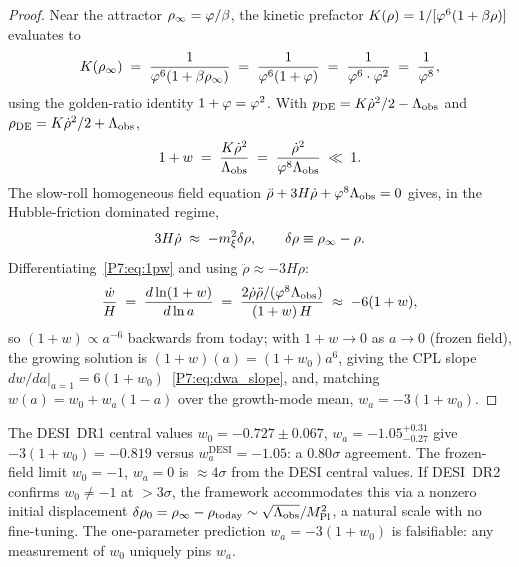 \begin{proof}
Near the attractor $\rho_{\infty}=\varphi/\beta$, the kinetic prefactor
$K(\rho)=1/[\varphi^6(1+\beta\rho)]$ evaluates to
\begin{equation}
  K(\rho_{\infty})
  \;=\; \frac{1}{\varphi^6(1+\beta\rho_{\infty})}
  \;=\; \frac{1}{\varphi^6(1+\varphi)}
  \;=\; \frac{1}{\varphi^6\cdot\varphi^2}
  \;=\; \frac{1}{\varphi^8},
  \label{P7:eq:K_attractor}
\end{equation}
using the golden-ratio identity $1+\varphi=\varphi^2$. With
$p_{\mathrm{DE}}=K\dot\rho^2/2-\Lambda_{\mathrm{obs}}$ and
$\rho_{\mathrm{DE}}=K\dot\rho^2/2+\Lambda_{\mathrm{obs}}$,
\begin{equation}
  1+w \;=\; \frac{K\dot\rho^2}{\Lambda_{\mathrm{obs}}} \;=\; \frac{\dot\rho^2}{\varphi^8\Lambda_{\mathrm{obs}}} \;\ll\; 1.
  \label{P7:eq:1pw}
\end{equation}
The slow-roll homogeneous field equation $\ddot\rho+3H\dot\rho+\varphi^8\Lambda_{\mathrm{obs}}=0$
gives, in the Hubble-friction dominated regime,
\begin{equation}
  3H\dot\rho \;\approx\; -m_\xi^2\delta\rho, \qquad \delta\rho\equiv\rho_{\infty}-\rho.
  \label{P7:eq:slow_roll}
\end{equation}
Differentiating~\eqref{P7:eq:1pw} and using $\ddot\rho\approx-3H\dot\rho$:
\begin{equation}
  \frac{\dot w}{H}
  \;=\; \frac{d\ln(1+w)}{d\ln a}
  \;=\; \frac{2\dot\rho\ddot\rho/(\varphi^8\Lambda_{\mathrm{obs}})}{(1+w)\,H}
  \;\approx\; -6(1+w),
  \label{P7:eq:dwda}
\end{equation}
so $(1+w)\propto a^{-6}$ backwards from today; with $1+w\to0$ as
$a\to0$ (frozen field), the growing solution is
$(1+w)(a)=(1+w_0)a^6$, giving the CPL slope
$dw/da|_{a=1}=6(1+w_0)$~\eqref{P7:eq:dwa_slope}, and, matching
$w(a)=w_0+w_a(1-a)$ over the growth-mode mean, $w_a=-3(1+w_0)$.
\end{proof}

\begin{remark}
\label{P7:rem:desi_consistency}
The DESI~DR1 central values $w_0=-0.727\pm0.067$, $w_a=-1.05^{+0.31}_{-0.27}$
give $-3(1+w_0)=-0.819$ versus $w_a^\mathrm{DESI}=-1.05$: a $0.80\sigma$
agreement.  The frozen-field limit $w_0=-1$, $w_a=0$ is $\approx4\sigma$ from
the DESI central values.
If DESI~DR2 confirms $w_0\neq-1$ at $>3\sigma$, the framework
accommodates this via a nonzero initial displacement
$\delta\rho_0=\rho_{\infty}-\rho_\mathrm{today}\sim\sqrt{\Lambda_{\mathrm{obs}}}/M_{\mathrm{Pl}}^2$,
a natural scale with no fine-tuning.
The one-parameter prediction $w_a=-3(1+w_0)$ is falsifiable:
any measurement of $w_0$ uniquely pins $w_a$.
\end{remark}

